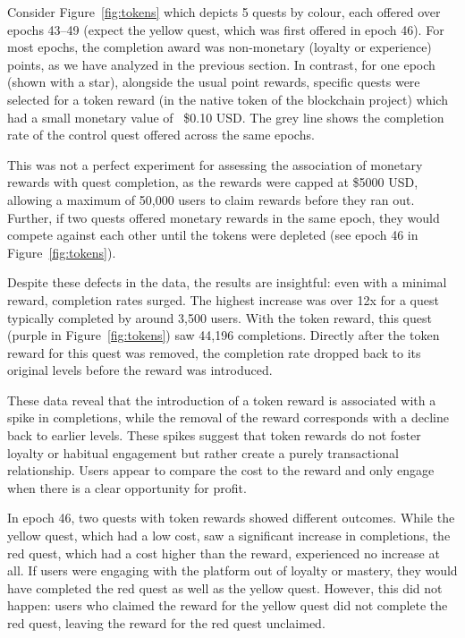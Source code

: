 Consider Figure~\ref{fig:tokens} which depicts 5 quests by colour, each offered over epochs 43--49 (expect the yellow quest, which was first offered in epoch 46). For most epochs, the completion award was non-monetary (loyalty or experience) points, as we have analyzed in the previous section. In contrast, for one epoch (shown with a star), alongside the usual point rewards, specific quests were selected for a token reward (in the native token of the blockchain project) which had a small monetary value of ~\$0.10 USD. The grey line shows the completion rate of the control quest offered across the same epochs.

This was not a perfect experiment for assessing the association of monetary rewards with quest completion, as the rewards were capped at \$5000 USD, allowing a maximum of 50,000 users to claim rewards before they ran out. Further, if two quests offered monetary rewards in the same epoch, they would compete against each other until the tokens were depleted (see epoch 46 in Figure~\ref{fig:tokens}).

Despite these defects in the data, the results are insightful: even with a minimal reward, completion rates surged. The highest increase was over 12x for a quest typically completed by around 3,500 users. With the token reward, this quest (purple in Figure~\ref{fig:tokens}) saw 44,196 completions. Directly after the token reward for this quest was removed, the completion rate dropped back to its original levels before the reward was introduced. 

These data reveal that the introduction of a token reward is associated with a spike in completions, while the removal of the reward corresponds with a decline back to earlier levels. These spikes suggest that token rewards do not foster loyalty or habitual engagement but rather create a purely transactional relationship. Users appear to compare the cost to the reward and only engage when there is a clear opportunity for profit.

In epoch 46, two quests with token rewards showed different outcomes. While the yellow quest, which had a low cost, saw a significant increase in completions, the red quest, which had a cost higher than the reward, experienced no increase at all. If users were engaging with the platform out of loyalty or mastery, they would have completed the red quest as well as the yellow quest. However, this did not happen: users who claimed the reward for the yellow quest did not complete the red quest, leaving the reward for the red quest unclaimed.

